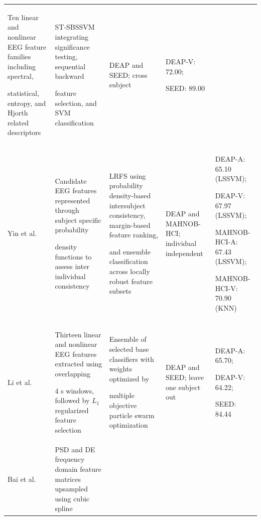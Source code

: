 \documentclass[ASNA,twocolumn]{USG}
\newcommand{\lightrowsep}{%
  \arrayrulecolor{lightrowgray}%
  \specialrule{0.30pt}{3.5pt}{3.5pt}%
  \arrayrulecolor{black}%
}
\begin{document}
\begin{table}
\begin{tabularx}{\textheight}{>{\raggedright\arraybackslash}p{3.15cm}>{\raggedright\arraybackslash}X>{\raggedright\arraybackslash}X>{\raggedright\arraybackslash}p{3.45cm}>{\raggedright\arraybackslash}p{5.0cm}}
Ten linear and nonlinear EEG feature families including spectral,

statistical, entropy, and Hjorth related descriptors &

ST-SBSSVM integrating significance testing, sequential backward

feature selection, and SVM classification &

DEAP and SEED; cross subject &

DEAP-V: 72.00;

SEED: 89.00 \\

\lightrowsep

Yin et al. \cite{yin2020locally} &

Candidate EEG features represented through subject specific probability

density functions to assess inter individual consistency &

LRFS using probability density-based intersubject consistency, margin-based feature ranking,

and ensemble classification across locally robust feature subsets &

DEAP and MAHNOB-HCI; individual independent &

DEAP-A: 65.10 (LSSVM);

DEAP-V: 67.97 (LSSVM);

MAHNOB-HCI-A: 67.43 (LSSVM);

MAHNOB-HCI-V: 70.90 (KNN) \\

\lightrowsep

Li et al. \cite{li2022novel} &

Thirteen linear and nonlinear EEG features extracted using overlapping

4 s windows, followed by $L_1$ regularized feature selection &

Ensemble of selected base classifiers with weights optimized by

multiple objective particle swarm optimization &

DEAP and SEED; leave one subject out &

DEAP-A: 65.70;

DEAP-V: 64.22;

SEED: 84.44 \\

\lightrowsep

Bai et al. \cite{bai2023sect} &

PSD and DE frequency domain feature matrices upsampled using cubic spline


\end{tabularx}
\end{table}
\end{document}
